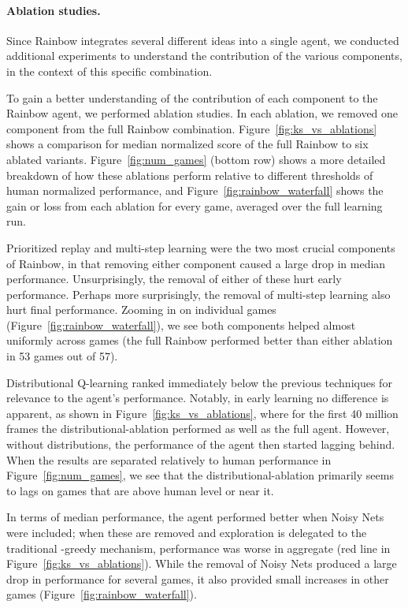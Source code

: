 \documentclass[letterpaper]{article} \usepackage{aaai18}  \usepackage{times}  \usepackage{helvet}  \usepackage{courier}  \usepackage{url}  \usepackage{graphicx}  \usepackage{amsmath,amssymb}
\begin{document}
\paragraph{Ablation studies.}
\label{ablation}
Since Rainbow integrates several different ideas into a single agent, we conducted additional experiments to understand the contribution of the various components, in the context of this specific combination. 

To gain a better understanding of the contribution of each component to the Rainbow agent, we performed ablation studies. In each ablation, we removed one component from the full Rainbow combination.
Figure~\ref{fig:ks_vs_ablations} shows a comparison for median normalized score of the full Rainbow to six ablated variants. Figure~\ref{fig:num_games} (bottom row) shows a more detailed breakdown of how these ablations perform relative to different thresholds of human normalized performance, and Figure~\ref{fig:rainbow_waterfall} shows the gain or loss from each ablation for every game, averaged over the full learning run.

Prioritized replay and multi-step learning were the two most crucial components of Rainbow, in that removing either component caused a large drop in median performance. Unsurprisingly, the removal of either of these hurt early performance. Perhaps more surprisingly, the removal of multi-step learning also hurt final performance. Zooming in on individual games (Figure~\ref{fig:rainbow_waterfall}), we see both components helped almost uniformly across games (the full Rainbow performed better than either ablation in 53 games out of 57).

Distributional Q-learning ranked immediately below the previous techniques for relevance to the agent's performance. Notably, in early learning no difference is apparent, as shown in Figure~\ref{fig:ks_vs_ablations}, where for the first 40 million frames the distributional-ablation performed as well as the full agent.  However, without distributions, the performance of the agent then started lagging behind.  When the results are separated relatively to human performance in Figure~\ref{fig:num_games}, we see that the distributional-ablation primarily seems to lags on games that are above human level or near it.

In terms of median performance, the agent performed better when Noisy Nets were included; when these are removed and exploration is delegated to the traditional -greedy mechanism, performance was worse in aggregate (red line in Figure~\ref{fig:ks_vs_ablations}). While the removal of Noisy Nets produced a large drop in performance for several games, it also provided small increases in other games (Figure~\ref{fig:rainbow_waterfall}).
\end{document}
